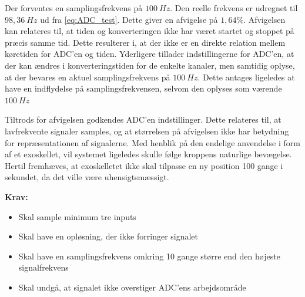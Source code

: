 \noindent
Der forventes en samplingsfrekvens på $100~Hz$. Den reelle frekvens er udregnet til $98,36~Hz$ ud fra \autoref{eq:ADC_test}. Dette giver en afvigelse på $1,64\%$. Afvigelsen kan relateres til, at tiden og konverteringen ikke har været startet og stoppet på præcis samme tid. Dette resulterer i, at der ikke er en direkte relation mellem køretiden for ADC'en og tiden. Yderligere tillader indstillingerne for ADC'en, at der kan ændres i konverteringstiden for de enkelte kanaler, men samtidig oplyse, at der bevares en aktuel samplingsfrekvens på $100~Hz$. Dette antages ligeledes at have en indflydelse på samplingsfrekvensen, selvom den oplyses som værende $100~Hz$ 

Tiltrods for afvigelsen godkendes ADC'en indstillinger. Dette relateres til, at lavfrekvente signaler samples, og at størrelsen på afvigelsen ikke har betydning for repræsentationen af signalerne. 
Med henblik på den endelige anvendelse i form af et exoskellet, vil systemet ligeledes skulle følge kroppens naturlige bevægelse. Hertil fremhæves, at exoskelletet ikke skal tilpasse en ny position 100 gange i sekundet, da det ville være uhensigtsmæssigt.


\vspace{3mm}
\textbf{Krav:}
\begin{itemize}
\item[\text{\sffamily \checkmark}] Skal sample minimum tre inputs 
\item[\text{\sffamily \checkmark}] Skal have en opløsning, der ikke forringer signalet
\item[\text{\sffamily \checkmark}] Skal have en samplingsfrekvens omkring 10 gange større end den højeste signalfrekvens
\item[\text{\sffamily \checkmark}] Skal undgå, at signalet ikke overstiger ADC'ens arbejdsområde
\end{itemize}
